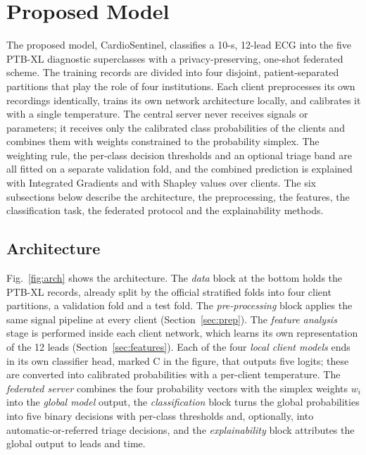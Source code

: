 \section{Proposed Model}
\label{sec:method}

The proposed model, CardioSentinel, classifies a 10-s, 12-lead ECG into the five PTB-XL diagnostic
superclasses with a privacy-preserving, one-shot federated scheme. The training records are divided
into four disjoint, patient-separated partitions that play the role of four institutions. Each
client preprocesses its own recordings identically, trains its own network architecture locally,
and calibrates it with a single temperature. The central server never receives signals or
parameters; it receives only the calibrated class probabilities of the clients and combines them
with weights constrained to the probability simplex. The weighting rule, the per-class decision
thresholds and an optional triage band are all fitted on a separate validation fold, and the
combined prediction is explained with Integrated Gradients and with Shapley values over clients.
The six subsections below describe the architecture, the preprocessing, the features, the
classification task, the federated protocol and the explainability methods.

\subsection{Architecture}
\label{sec:arch}

Fig.~\ref{fig:arch} shows the architecture. The \emph{data} block at the bottom holds the PTB-XL
records, already split by the official stratified folds into four client partitions, a validation
fold and a test fold. The \emph{pre-processing} block applies the same signal pipeline at every
client (Section~\ref{sec:prep}). The \emph{feature analysis} stage is performed inside each client
network, which learns its own representation of the 12 leads (Section~\ref{sec:features}). Each of
the four \emph{local client models} ends in its own classifier head, marked C in the figure, that
outputs five logits; these are converted into calibrated probabilities with a per-client
temperature. The \emph{federated server} combines the four probability vectors with the simplex
weights $w_i$ into the \emph{global model} output, the \emph{classification} block turns the global
probabilities into five binary decisions with per-class thresholds and, optionally, into
automatic-or-referred triage decisions, and the \emph{explainability} block attributes the global
output to leads and time.

